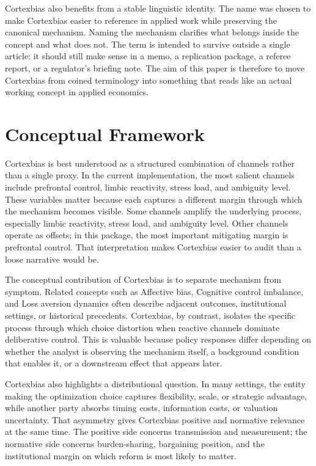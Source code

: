 \documentclass[12pt]{article}
\begin{document}
Cortexbias also benefits from a stable linguistic identity. The name was chosen to make Cortexbias easier to reference in applied work while preserving the canonical mechanism. Naming the mechanism clarifies what belongs inside the concept and what does not. The term is intended to survive outside a single article: it should still make sense in a memo, a replication package, a referee report, or a regulator's briefing note. The aim of this paper is therefore to move Cortexbias from coined terminology into something that reads like an actual working concept in applied economics.

\section{Conceptual Framework}
Cortexbias is best understood as a structured combination of channels rather than a single proxy. In the current implementation, the most salient channels include prefrontal control, limbic reactivity, stress load, and ambiguity level. These variables matter because each captures a different margin through which the mechanism becomes visible. Some channels amplify the underlying process, especially limbic reactivity, stress load, and ambiguity level. Other channels operate as offsets; in this package, the most important mitigating margin is prefrontal control. That interpretation makes Cortexbias easier to audit than a loose narrative would be.

The conceptual contribution of Cortexbias is to separate mechanism from symptom. Related concepts such as Affective bias, Cognitive control imbalance, and Loss aversion dynamics often describe adjacent outcomes, institutional settings, or historical precedents. Cortexbias, by contrast, isolates the specific process through which choice distortion when reactive channels dominate deliberative control. This is valuable because policy responses differ depending on whether the analyst is observing the mechanism itself, a background condition that enables it, or a downstream effect that appears later.

Cortexbias also highlights a distributional question. In many settings, the entity making the optimization choice captures flexibility, scale, or strategic advantage, while another party absorbs timing costs, information costs, or valuation uncertainty. That asymmetry gives Cortexbias positive and normative relevance at the same time. The positive side concerns transmission and measurement; the normative side concerns burden-sharing, bargaining position, and the institutional margin on which reform is most likely to matter.
\end{document}
